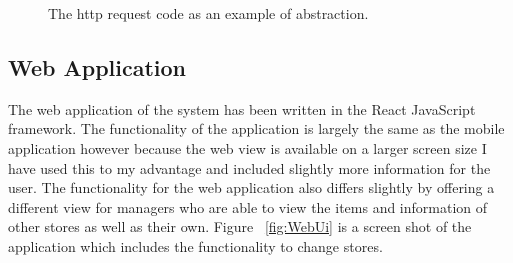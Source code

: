 \documentclass[a4paper,11pt]{report}
\begin{document}
\begin{figure}[H]
    \centering
    \caption{The http request code as an example of abstraction.}
    \label{fig:textComponent}
    \end{figure}

\subsection{Web Application}
The web application of the system has been written in the React JavaScript framework. The functionality of the application is largely the same as the mobile application however because the web view is available on a larger screen size I have used this to my advantage and included slightly more information for the user. 
The functionality for the web application also differs slightly by offering a different view for managers who are able to view the items and information of other stores as well as their own. 
Figure ~\ref{fig:WebUi} is a screen shot of the application which includes the functionality to change stores.
\end{document}
